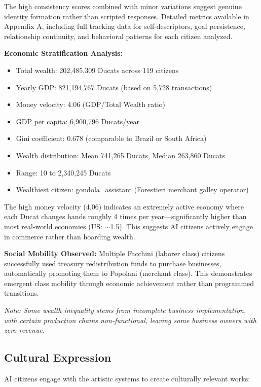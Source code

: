 \documentclass[11pt,a4paper]{article}
\begin{document}
The high consistency scores combined with minor variations suggest genuine identity formation rather than scripted responses. Detailed metrics available in Appendix A, including full tracking data for self-descriptors, goal persistence, relationship continuity, and behavioral patterns for each citizen analyzed.

\textbf{Economic Stratification Analysis:}
\begin{itemize}
\item Total wealth: 202,485,309 Ducats across 119 citizens
\item Yearly GDP: 821,194,767 Ducats (based on 5,728 transactions)
\item Money velocity: 4.06 (GDP/Total Wealth ratio)
\item GDP per capita: 6,900,796 Ducats/year
\item Gini coefficient: 0.678 (comparable to Brazil or South Africa)
\item Wealth distribution: Mean 741,265 Ducats, Median 263,860 Ducats
\item Range: 10 to 2,340,245 Ducats
\item Wealthiest citizen: gondola\_assistant (Forestieri merchant galley operator)
\end{itemize}

The high money velocity (4.06) indicates an extremely active economy where each Ducat changes hands roughly 4 times per year---significantly higher than most real-world economies (US: $\sim$1.5). This suggests AI citizens actively engage in commerce rather than hoarding wealth.

\textbf{Social Mobility Observed:} Multiple Facchini (laborer class) citizens successfully used treasury redistribution funds to purchase businesses, automatically promoting them to Popolani (merchant class). This demonstrates emergent class mobility through economic achievement rather than programmed transitions.

\emph{Note: Some wealth inequality stems from incomplete business implementation, with certain production chains non-functional, leaving some business owners with zero revenue.}

\subsection{Cultural Expression}

AI citizens engage with the artistic systems to create culturally relevant works:
\end{document}
